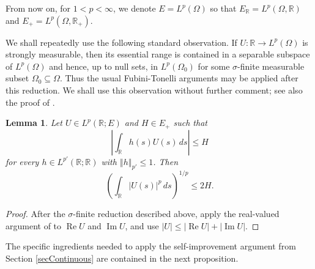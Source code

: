 \documentclass[12pt]{amsart}
\theoremstyle{plain}
\newtheorem{lemma}[thm]{Lemma}
\theoremstyle{remark}
\theoremstyle{definition}
\newcommand{\R}{\mathbb{R}}
\newcommand{\norm}[1]{\left\Vert #1\right\Vert}
\begin{document}
	From now on, for $1<p<\infty$, we denote $E = L^p(\Omega)$ so that $E_{\R} = L^p(\Omega, \R)$ and $E_{+} = L^p(\Omega, \R_+)$.
	
	We shall repeatedly use the following standard observation. If
	$U:\R\to L^p(\Omega)$ is strongly measurable, then its essential range is
	contained in a separable subspace of $L^p(\Omega)$ and hence, up to null
	sets, in $L^p(\Omega_0)$ for some $\sigma$-finite measurable subset
	$\Omega_0\subseteq\Omega$. Thus the usual Fubini-Tonelli arguments may be
	applied after this reduction. We shall use this observation without further
	comment; see also the proof of \cite[Lemma 1]{Vogt2022}.
	\begin{lemma}\label{lemIndividualLatticeDuality}
		Let
		$U\in L^p(\R;E)$ and $ H\in E_+$ such that
		\[
		\left|
		\int_{\R}h(s)U(s)\,ds
		\right|
		\le H
		\]
		for every $h\in L^{p'}(\R;\R)$ with $\norm{h}_{p'}\le1$. Then
		\begin{equation*}\label{eqIndividualLatticeDuality}
			\left(
			\int_{\R}|U(s)|^p\,ds
			\right)^{1/p}
			\le 2H.
		\end{equation*}
	\end{lemma}
	\begin{proof}
		After the $\sigma$-finite reduction described above, apply the real-valued
		argument of \cite[Lemma 1]{Vogt2022} to $\operatorname{Re}U$ and
		$\operatorname{Im}U$, and use
		$|U|\le|\operatorname{Re}U|+|\operatorname{Im}U|$.
	\end{proof}
	The specific ingredients needed to apply the self-improvement argument from Section \ref{secContinuous} are
	contained in the next proposition. 
	
\end{document}
